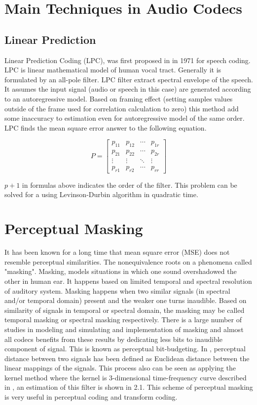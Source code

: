 \section{Main Techniques in Audio Codecs}

\subsection{Linear Prediction}
Linear Prediction Coding (LPC), was first proposed in \cite{} in 1971 for speech coding.
LPC is linear mathematical model of human vocal tract. \cite{} Generally it is formulated by
an all-pole filter. LPC filter extract spectral envelope of the speech. It assumes the input
signal (audio or speech in this case) are generated according to an autoregressive model.
Based on framing effect (setting samples values outside of the frame used for correlation
calculation to zero) this method add some inaccuracy to estimation even for autoregressive
model of the same order.
LPC finds the mean square error answer to the following equation.

\begin{equation}
P=
\begin{bmatrix} p_{11} & p_{12} & \cdots & p_{1r} \\
p_{21} & p_{22} & \cdots & p_{2r} \\
\vdots & \vdots & \ddots & \vdots \\
p_{r1} & p_{r2} & \cdots & p_{rr}
\end{bmatrix}
\end{equation}

$p + 1$ in formulas above indicates the order of the filter.
This problem can be solved for a using Levinson-Durbin algorithm in quadratic
 time.
 
\section{Perceptual Masking}
It has been known for a long time that mean square error (MSE) does not resemble perceptual
similarities. The nonequivalence roots on a phenomena called "masking". Masking,
models situations in which one sound overshadowed the other in human ear. It happens
based on limited temporal and spectral resolution of auditory system. Masking happens
when two similar signals (in spectral and/or temporal domain) present and the weaker
one turns inaudible. Based on similarity of signals in temporal or spectral domain, the
masking may be called temporal masking or spectral masking respectively.
There is a large number of studies in modeling and simulating and implementation of masking
and almost all codecs benefits from these results by dedicating less bits to inaudible
component of signal. This is known as perceptual bit-budgeting. \cite{} In \cite{}, perceptual
distance between two signals has been defined as Euclidean distance between the linear
mappings of the signals. This process also can be seen as applying the kernel method
where the kernel is 3-dimensional time-frequency curve described in \cite{}, an estimation of
this filter is shown in 2.1. This scheme of perceptual masking is very useful in perceptual
coding and transform coding.

